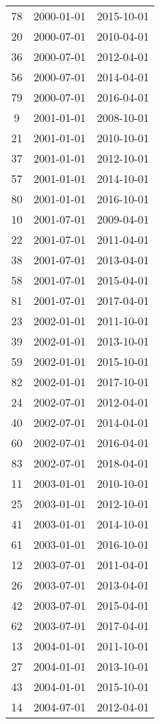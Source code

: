 \begin{tabular}{ccc}
  78 & 2000-01-01 & 2015-10-01 \\ 
  20 & 2000-07-01 & 2010-04-01 \\ 
  36 & 2000-07-01 & 2012-04-01 \\ 
  56 & 2000-07-01 & 2014-04-01 \\ 
  79 & 2000-07-01 & 2016-04-01 \\ 
  9 & 2001-01-01 & 2008-10-01 \\ 
  21 & 2001-01-01 & 2010-10-01 \\ 
  37 & 2001-01-01 & 2012-10-01 \\ 
  57 & 2001-01-01 & 2014-10-01 \\ 
  80 & 2001-01-01 & 2016-10-01 \\ 
  10 & 2001-07-01 & 2009-04-01 \\ 
  22 & 2001-07-01 & 2011-04-01 \\ 
  38 & 2001-07-01 & 2013-04-01 \\ 
  58 & 2001-07-01 & 2015-04-01 \\ 
  81 & 2001-07-01 & 2017-04-01 \\ 
  23 & 2002-01-01 & 2011-10-01 \\ 
  39 & 2002-01-01 & 2013-10-01 \\ 
  59 & 2002-01-01 & 2015-10-01 \\ 
  82 & 2002-01-01 & 2017-10-01 \\ 
  24 & 2002-07-01 & 2012-04-01 \\ 
  40 & 2002-07-01 & 2014-04-01 \\ 
  60 & 2002-07-01 & 2016-04-01 \\ 
  83 & 2002-07-01 & 2018-04-01 \\ 
  11 & 2003-01-01 & 2010-10-01 \\ 
  25 & 2003-01-01 & 2012-10-01 \\ 
  41 & 2003-01-01 & 2014-10-01 \\ 
  61 & 2003-01-01 & 2016-10-01 \\ 
  12 & 2003-07-01 & 2011-04-01 \\ 
  26 & 2003-07-01 & 2013-04-01 \\ 
  42 & 2003-07-01 & 2015-04-01 \\ 
  62 & 2003-07-01 & 2017-04-01 \\ 
  13 & 2004-01-01 & 2011-10-01 \\ 
  27 & 2004-01-01 & 2013-10-01 \\ 
  43 & 2004-01-01 & 2015-10-01 \\ 
  14 & 2004-07-01 & 2012-04-01 \\ 

\end{tabular}
